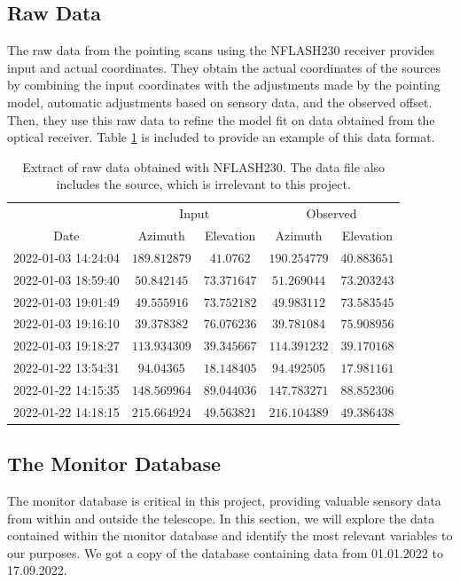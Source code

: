 \subsection{Raw Data}
The raw data from the pointing scans using the NFLASH230 receiver provides input and actual coordinates.
They obtain the actual coordinates of the sources by combining the input coordinates with the adjustments made by the pointing model,
automatic adjustments based on sensory data, and the observed offset.
Then, they use this raw data to refine the model fit on data obtained from the optical receiver.
Table \ref{tab:raw_datanflash230} is included to provide an example of this data format. 


\begin{table}[h]
    \centering
    \caption{Extract of raw data obtained with NFLASH230. The data file also includes the source, which is irrelevant to this project.}
    \begin{tabular}{ccccc}
         & \multicolumn{2}{c}{Input} & \multicolumn{2}{c}{Observed} \\ 
        \cline{2-3} \cline{4-5}
        Date & Azimuth & Elevation & Azimuth & Elevation \\ 
        \hline
        2022-01-03 14:24:04 & $189.812879$ & $41.0762$ & $190.254779$ & $40.883651$ \\
        2022-01-03 18:59:40 & $50.842145$ & $73.371647$ & $51.269044$ & $73.203243$ \\
        2022-01-03 19:01:49 & $49.555916$ & $73.752182$ & $49.983112$ & $73.583545$ \\
        2022-01-03 19:16:10 & $39.378382$ & $76.076236$ & $39.781084$ & $75.908956$ \\
        2022-01-03 19:18:27 & $113.934309$ & $39.345667$ & $114.391232$ & $39.170168$ \\
        2022-01-22 13:54:31 & $94.04365$ & $18.148405$ & $94.492505$ & $17.981161$ \\
        2022-01-22 14:15:35 & $148.569964$ & $89.044036$ & $147.783271$ & $88.852306$ \\
        2022-01-22 14:18:15 & $215.664924$ & $49.563821$ & $216.104389$ & $49.386438$ \\
    \end{tabular}
    \label{tab:raw_datanflash230}
    \end{table}



\subsection{The Monitor Database}
The monitor database is critical in this project, providing valuable sensory data from within and outside the telescope.
In this section, we will explore the data contained within the monitor database and identify the most relevant variables to our purposes.
We got a copy of the database containing data from 01.01.2022 to 17.09.2022.

